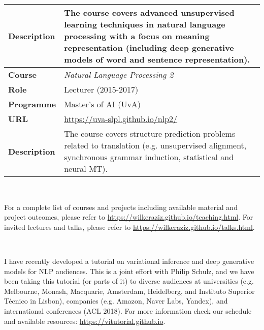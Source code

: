 \begin{center}
\begin{tabular}{l p{}}
{\bf Description} & The course covers advanced unsupervised learning techniques in natural language processing with a focus on meaning representation (including deep generative models of word and sentence representation).
\\ \midrule
{\bf Course} & {\it Natural Language Processing 2} \\
{\bf Role}   & Lecturer (2015-2017) \\
{\bf Programme} & Master's of AI (UvA)\\
{\bf URL} & \url{https://uva-slpl.github.io/nlp2/} \\
{\bf Description} & The course covers structure prediction problems related to translation (e.g. unsupervised alignment, synchronous grammar induction, statistical and neural MT). 
\\ 
\bottomrule
\end{tabular}
\end{center}

~

For a complete list of courses and projects including available material and project outcomes, please refer to \url{https://wilkeraziz.github.io/teaching.html}.
For invited lectures and talks, please refer to \url{https://wilkeraziz.github.io/talks.html}.

~


I have recently developed a tutorial on variational inference and deep generative models for NLP audiences. This is a joint effort with Philip Schulz, and we have been taking this tutorial (or parts of it) to diverse audiences at universities (e.g. Melbourne, Monash, Macquarie, Amsterdam, Heidelberg, and Instituto Superior T\'{e}cnico in Lisbon), companies (e.g. Amazon, Naver Labs, Yandex), and international conferences (ACL 2018). For more information check our schedule and available resources: \url{https://vitutorial.github.io}.




